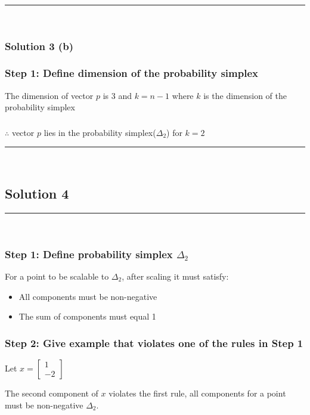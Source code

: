 \documentclass{article}
\begin{document}
\noindent\rule{\textwidth}{0.4pt}\\

\subsubsection*{Solution 3 (b)}
\subsubsection*{Step 1: Define dimension of the probability simplex}
\parbox{\textwidth}{
The dimension of vector $p$ is $3$ and $k=n-1$ where $k$ is the dimension of the probability simplex
}
\subsubsection*{\normalfont}{$\therefore$ vector $p$ lies in the probability simplex($\Delta_2$) for $k=2$}

\noindent\rule{\textwidth}{0.4pt}\\

\newpage

\subsection*{Solution 4}
\noindent\rule{\textwidth}{0.4pt}\\

\subsubsection*{Step 1: Define probability simplex $\Delta_2$ }
\parbox{\textwidth}{

For a point to be scalable to $\Delta_2$, after scaling it must satisfy:
\begin{itemize}
\item All components must be non-negative
\item The sum of components must equal 1
\end{itemize}
}

\subsubsection*{Step 2: Give example that violates one of the rules in Step 1}
\parbox{\textwidth}{
Let $x = \begin{bmatrix} 1 \\ -2 \end{bmatrix}$

The second component of $x$ violates the first rule, all components for a point must be non-negative $\Delta_2$.
}
\end{document}
